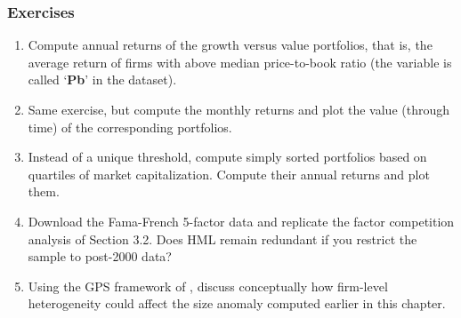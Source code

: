 \subsubsection{Exercises}

\begin{enumerate}
\item Compute annual returns of the growth versus value portfolios, that is, the average return of firms with above median price-to-book ratio (the variable is called `\textbf{Pb}' in the dataset).
\item Same exercise, but compute the monthly returns and plot the value (through time) of the corresponding portfolios.
\item Instead of a unique threshold, compute simply sorted portfolios based on quartiles of market capitalization. Compute their annual returns and plot them.
\item Download the Fama-French 5-factor data and replicate the factor competition analysis of Section 3.2. Does HML remain redundant if you restrict the sample to post-2000 data?
\item Using the GPS framework of \cite{hoechle2025generalized}, discuss conceptually how firm-level heterogeneity could affect the size anomaly computed earlier in this chapter.
\end{enumerate}